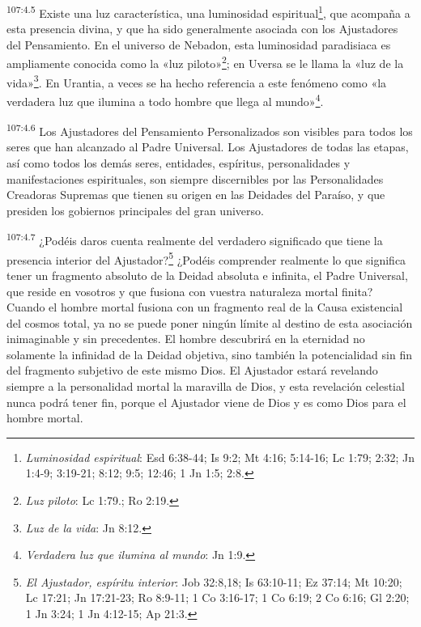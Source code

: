 \par
\textsuperscript{107:4.5} Existe una luz característica, una luminosidad espiritual\footnote{\textit{Luminosidad espiritual}: Esd 6:38-44; Is 9:2; Mt 4:16; 5:14-16; Lc 1:79; 2:32; Jn 1:4-9; 3:19-21; 8:12; 9:5; 12:46; 1 Jn 1:5; 2:8.}, que acompaña a esta presencia divina, y que ha sido generalmente asociada con los Ajustadores del Pensamiento. En el universo de Nebadon, esta luminosidad paradisiaca es ampliamente conocida como la «luz piloto»\footnote{\textit{Luz piloto}: Lc 1:79.; Ro 2:19.}; en Uversa se le llama la «luz de la vida»\footnote{\textit{Luz de la vida}: Jn 8:12.}. En Urantia, a veces se ha hecho referencia a este fenómeno como «la verdadera luz que ilumina a todo hombre que llega al mundo»\footnote{\textit{Verdadera luz que ilumina al mundo}: Jn 1:9.}.

\par
\textsuperscript{107:4.6} Los Ajustadores del Pensamiento Personalizados son visibles para todos los seres que han alcanzado al Padre Universal. Los Ajustadores de todas las etapas, así como todos los demás seres, entidades, espíritus, personalidades y manifestaciones espirituales, son siempre discernibles por las Personalidades Creadoras Supremas que tienen su origen en las Deidades del Paraíso, y que presiden los gobiernos principales del gran universo.

\par
\textsuperscript{107:4.7} ¿Podéis daros cuenta realmente del verdadero significado que tiene la presencia interior del Ajustador?\footnote{\textit{El Ajustador, espíritu interior}: Job 32:8,18; Is 63:10-11; Ez 37:14; Mt 10:20; Lc 17:21; Jn 17:21-23; Ro 8:9-11; 1 Co 3:16-17; 1 Co 6:19; 2 Co 6:16; Gl 2:20; 1 Jn 3:24; 1 Jn 4:12-15; Ap 21:3.} ¿Podéis comprender realmente lo que significa tener un fragmento absoluto de la Deidad absoluta e infinita, el Padre Universal, que reside en vosotros y que fusiona con vuestra naturaleza mortal finita? Cuando el hombre mortal fusiona con un fragmento real de la Causa existencial del cosmos total, ya no se puede poner ningún límite al destino de esta asociación inimaginable y sin precedentes. El hombre descubrirá en la eternidad no solamente la infinidad de la Deidad objetiva, sino también la potencialidad sin fin del fragmento subjetivo de este mismo Dios. El Ajustador estará revelando siempre a la personalidad mortal la maravilla de Dios, y esta revelación celestial nunca podrá tener fin, porque el Ajustador viene de Dios y es como Dios para el hombre mortal.

